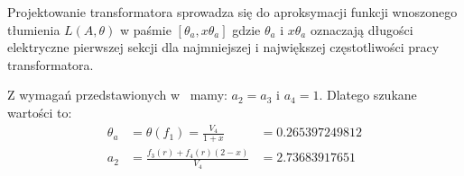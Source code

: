 \documentclass[rep.tex]{subfiles}
\begin{document}
Projektowanie transformatora sprowadza się do aproksymacji funkcji wnoszonego tłumienia $L(A, \theta)$ w paśmie $[\theta_a, x\theta_a]$ gdzie $\theta_a$ i $x\theta_a$ oznaczają długości elektryczne pierwszej sekcji dla najmniejszej i największej częstotliwości pracy transformatora.

Z wymagań przedstawionych w~\cite{obwody} mamy: $a_2 = a_3$ i $a_4 = 1$.
Dlatego szukane wartości to:
\begin{align}
  \theta_a &= \theta(f_1) = \frac{V_4}{1 + x} &= 0.265397249812 \label{eqn:zad10:theta} \\
  a_2 &= \frac{f_3(r) + f_4(r)(2 - x)}{V_4} &= 2.73683917651 \label{eqn:zad10:a2}
\end{align}
\end{document}
